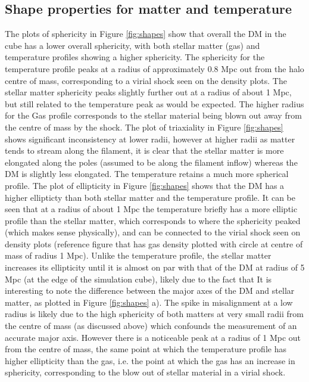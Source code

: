 \documentclass[journal]{IEEEtran}
\begin{document}
\subsection{Shape properties for matter and temperature}
The plots of sphericity in Figure \ref{fig:shapes} show that overall the DM in the cube has a lower overall sphericity, with both stellar matter (gas) and temperature profiles showing a higher sphericity. The sphericity for the temperature profile peaks at a radius of approximately 0.8 Mpc out from the halo centre of mass, corresponding to a virial shock seen on the density plots. The stellar matter sphericity peaks slightly further out at a radius of about 1 Mpc, but still related to the temperature peak as would be expected. The higher radius for the Gas profile corresponds to the stellar material being blown out away from the centre of mass by the shock. 
The plot of triaxiality in Figure \ref{fig:shapes} shows significant inconsistency at lower radii, however at higher radii as matter tends to stream along the filament, it is clear that the stellar matter is more elongated along the poles (assumed to be along the filament inflow) whereas the DM is slightly less elongated. The temperature retains a much more spherical profile.
The plot of ellipticity in Figure \ref{fig:shapes} shows that the DM has a higher ellipticty than both stellar matter and the temperature profile. It can be seen that at a radius of about 1 Mpc the temperature briefly has a more elliptic profile than the stellar matter, which corresponds to where the sphericity peaked (which makes sense physically), and can be connected to the virial shock seen on density plots (reference figure that has gas density plotted with circle at centre of mass of radius 1 Mpc). Unlike the temperature profile, the stellar matter increases its ellipticity until it is almost on par with that of the DM at radius of 5 Mpc (at the edge of the simulation cube), likely due to the fact that 
It is interesting to note the difference between the major axes of the DM and stellar matter, as plotted in Figure \ref{fig:shapes} a). The spike in misalignment at a low radius is likely due to the high sphericity of both matters at very small radii from the centre of mass (as discussed above) which confounds the measurement of an accurate major axis. However there is a noticeable peak at a radius of 1 Mpc out from the centre of mass, the same point at which the temperature profile has higher ellipticity than the gas, i.e. the point at which the gas has an increase in sphericity, corresponding to the blow out of stellar material in a virial shock.
\end{document}
